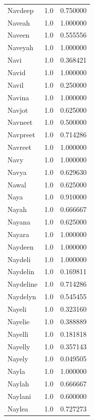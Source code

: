 \documentclass[
  letterpaper,
  DIV=11,
  numbers=noendperiod]{scrreprt}
\begin{document}
\begin{tabular}{lrr}
Navdeep         &   1.0 &   0.750000 \\
Naveah          &   1.0 &   1.000000 \\
Naveen          &   1.0 &   0.555556 \\
Naveyah         &   1.0 &   1.000000 \\
Navi            &   1.0 &   0.368421 \\
Navid           &   1.0 &   1.000000 \\
Navil           &   1.0 &   0.250000 \\
Navina          &   1.0 &   1.000000 \\
Navjot          &   1.0 &   0.625000 \\
Navneet         &   1.0 &   0.500000 \\
Navpreet        &   1.0 &   0.714286 \\
Navreet         &   1.0 &   1.000000 \\
Navy            &   1.0 &   1.000000 \\
Navya           &   1.0 &   0.629630 \\
Nawal           &   1.0 &   0.625000 \\
Naya            &   1.0 &   0.910000 \\
Nayah           &   1.0 &   0.666667 \\
Nayana          &   1.0 &   0.625000 \\
Nayara          &   1.0 &   1.000000 \\
Naydeen         &   1.0 &   1.000000 \\
Naydeli         &   1.0 &   1.000000 \\
Naydelin        &   1.0 &   0.169811 \\
Naydeline       &   1.0 &   0.714286 \\
Naydelyn        &   1.0 &   0.545455 \\
Nayeli          &   1.0 &   0.323160 \\
Nayelie         &   1.0 &   0.388889 \\
Nayelli         &   1.0 &   0.181818 \\
Nayelly         &   1.0 &   0.357143 \\
Nayely          &   1.0 &   0.049505 \\
Nayla           &   1.0 &   1.000000 \\
Naylah          &   1.0 &   0.666667 \\
Naylani         &   1.0 &   0.600000 \\
Naylea          &   1.0 &   0.727273 \\

\end{tabular}
\end{document}
